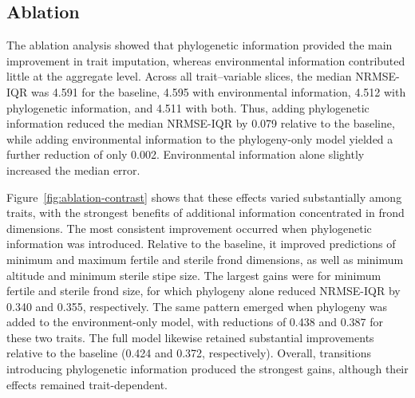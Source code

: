 \documentclass[preprint,12pt,authoryear]{elsarticle}
\newcommand{\awesomeModel}{PhyEnv-NN }
\begin{document}

\subsection{Ablation}

The ablation analysis showed that phylogenetic information provided the main improvement in trait imputation, whereas environmental information contributed little at the aggregate level. Across all trait--variable slices, the median NRMSE-IQR was 4.591 for the baseline, 4.595 with environmental information, 4.512 with phylogenetic information, and 4.511 with both. Thus, adding phylogenetic information reduced the median NRMSE-IQR by 0.079 relative to the baseline, while adding environmental information to the phylogeny-only model yielded a further reduction of only 0.002. Environmental information alone slightly increased the median error.

Figure~\ref{fig:ablation-contrast} shows that these effects varied substantially among traits, with the strongest benefits of additional information concentrated in frond dimensions. The most consistent improvement occurred when phylogenetic information was introduced. Relative to the baseline, it improved predictions of minimum and maximum fertile and sterile frond dimensions, as well as minimum altitude and minimum sterile stipe size. The largest gains were for minimum fertile and sterile frond size, for which phylogeny alone reduced NRMSE-IQR by 0.340 and 0.355, respectively. The same pattern emerged when phylogeny was added to the environment-only model, with reductions of 0.438 and 0.387 for these two traits. The full model likewise retained substantial improvements relative to the baseline (0.424 and 0.372, respectively). Overall, transitions introducing phylogenetic information produced the strongest gains, although their effects remained trait-dependent.
\end{document}
